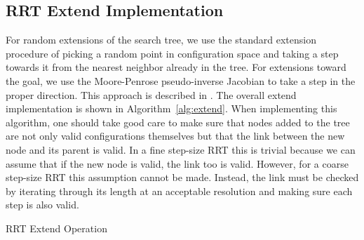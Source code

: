 \documentclass[conference]{IEEEtran}
\begin{document}
\subsection{RRT Extend Implementation}
For random extensions of the search tree, we use the standard extension procedure of picking a random point in configuration space and
taking a step towards it from the nearest neighbor already in the tree. For extensions toward the goal, we use the Moore-Penrose
pseudo-inverse Jacobian to take a step in the proper direction. This approach is described in \cite{vahrenkamp09}. The overall extend
implementation is shown in Algorithm~\ref{alg:extend}. When implementing this algorithm, one should take good care to make sure that nodes
added to the tree are not only valid configurations themselves but that the link between the new node and its parent is valid. In a fine
step-size RRT this is trivial because we can assume that if the new node is valid, the link too is valid. However, for a coarse step-size
RRT this assumption cannot be made. Instead, the link must be checked by iterating through its length at an acceptable resolution and making
sure each step is also valid.
\begin{algorithm}
 \label{alg:extend}
 \SetAlgoLined
\caption{RRT Extend Operation}
\end{algorithm}
\end{document}
